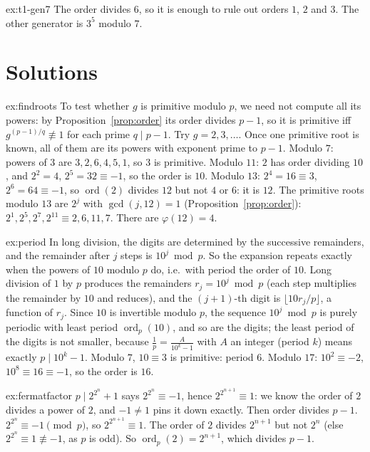 \begin{hint}{ex:t1-gen7}
The order divides $6$, so it is enough to rule out orders $1$, $2$ and $3$. The other generator is $3^5$ modulo $7$.
\end{hint}

\section{Solutions}

\begin{solution}{ex:findroots}
\idea To test whether $g$ is primitive modulo $p$, we need not compute all its powers: by Proposition~\ref{prop:order} its order divides $p-1$, so it is primitive iff $g^{(p-1)/q}\not\equiv1$ for each prime $q\mid p-1$. Try $g=2,3,\dots$. Once one primitive root is known, all of them are its powers with exponent prime to $p-1$.
\writeup Modulo $7$: powers of $3$ are $3,2,6,4,5,1$, so $3$ is primitive. Modulo $11$: $2$ has order dividing $10$, and $2^2=4$, $2^5=32\equiv-1$, so the order is $10$. Modulo $13$: $2^4=16\equiv3$, $2^6=64\equiv-1$, so $\operatorname{ord}(2)$ divides $12$ but not $4$ or $6$: it is $12$. The primitive roots modulo $13$ are $2^j$ with $\gcd(j,12)=1$ (Proposition~\ref{prop:order}): $2^1,2^5,2^7,2^{11}\equiv2,6,11,7$. There are $\varphi(12)=4$.
\end{solution}

\begin{solution}{ex:period}
\idea In long division, the digits are determined by the successive remainders, and the remainder after $j$ steps is $10^j\bmod p$. So the expansion repeats exactly when the powers of $10$ modulo $p$ do, i.e.\ with period the order of $10$.
\writeup Long division of $1$ by $p$ produces the remainders $r_j=10^j\bmod p$ (each step multiplies the remainder by $10$ and reduces), and the $(j+1)$-th digit is $\lfloor10r_j/p\rfloor$, a function of $r_j$. Since $10$ is invertible modulo $p$, the sequence $10^j\bmod p$ is purely periodic with least period $\operatorname{ord}_p(10)$, and so are the digits; the least period of the digits is not smaller, because $\frac1p=\frac{A}{10^k-1}$ with $A$ an integer (period $k$) means exactly $p\mid10^k-1$. Modulo $7$, $10\equiv3$ is primitive: period $6$. Modulo $17$: $10^2\equiv-2$, $10^8\equiv16\equiv-1$, so the order is $16$.
\end{solution}

\begin{solution}{ex:fermatfactor}
\idea $p\mid2^{2^n}+1$ says $2^{2^n}\equiv-1$, hence $2^{2^{n+1}}\equiv1$: we know the order of $2$ divides a power of $2$, and $-1\ne1$ pins it down exactly. Then order divides $p-1$.
\writeup $2^{2^n}\equiv-1\pmod p$, so $2^{2^{n+1}}\equiv1$. The order of $2$ divides $2^{n+1}$ but not $2^n$ (else $2^{2^n}\equiv1\not\equiv-1$, as $p$ is odd). So $\operatorname{ord}_p(2)=2^{n+1}$, which divides $p-1$.
\end{solution}


